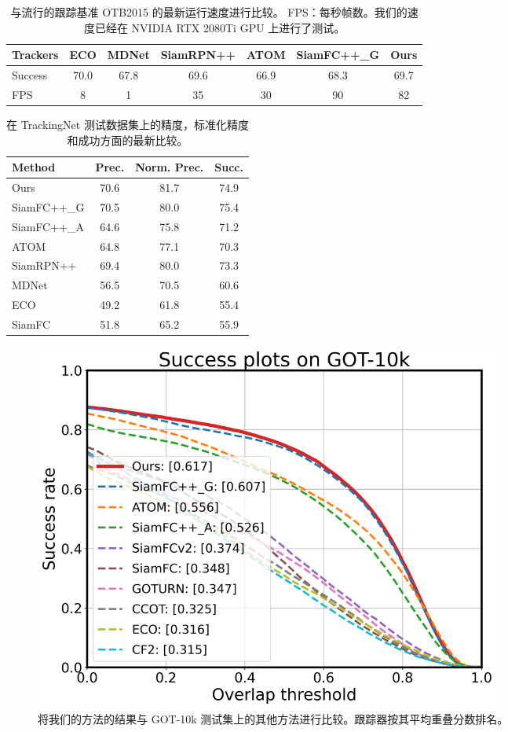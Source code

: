\begin{table}[t]
\renewcommand\arraystretch{0.8}
\caption{与流行的跟踪基准 OTB2015 的最新运行速度进行比较。 FPS：每秒帧数。我们的速度已经在 NVIDIA RTX 2080Ti GPU 上进行了测试。}
\setlength{\tabcolsep}{3pt}
\begin{center}
\begin{tabular}{l | c c c c c c}
\toprule
Trackers & ECO & MDNet & SiamRPN++ & ATOM & SiamFC++\_G & Ours \\
\midrule
Success & 70.0 & 67.8  & 69.6      & 66.9      & 68.3       & 69.7 \\
FPS     & 8    & 1     & 35        & 30       & 90         & 82  \\
\bottomrule
\end{tabular}
\end{center}
\label{table:otb}
\end{table}

\begin{table}[t]
\renewcommand\arraystretch{0.8}
\centering
\caption{在 TrackingNet 测试数据集上的精度，标准化精度和成功方面的最新比较。}
\begin{tabular}{l c c c}
\toprule
Method   &  Prec.   &  Norm. Prec. & Succ.  \\
\midrule
Ours  &  70.6&  81.7 &74.9 \\
SiamFC++\_G& 70.5 & 80.0 & 75.4 \\
SiamFC++\_A  & 64.6 & 75.8 & 71.2 \\
ATOM              & 64.8 & 77.1 & 70.3 \\
SiamRPN++&  69.4 & 80.0 &73.3 \\
MDNet	 &  56.5&  70.5 &60.6 \\
ECO	 &  49.2&  61.8 &55.4 \\
SiamFC	 &  51.8&  65.2 &55.9 \\
\bottomrule
\end{tabular}
\label{tabel:trackingnet}
\end{table}

\begin{figure}[t]
    \centering
    \includegraphics[width=0.75\textwidth]{Img/MTP/got10k/success_plot.png}
    \caption{将我们的方法的结果与 GOT-10k 测试集上的其他方法进行比较。跟踪器按其平均重叠分数排名。}
    \label{fig:got10k}
\end{figure}

